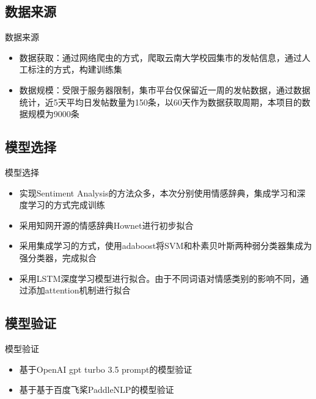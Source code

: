 \documentclass[UTF8]{ctexbeamer}
\begin{document}
\subsection{数据来源}
\begin{frame}{数据来源}
  \begin{itemize}
  \item {
    数据获取：通过网络爬虫的方式，爬取云南大学校园集市的发帖信息，通过人工标注的方式，构建训练集
  }
  \item {
    数据规模：受限于服务器限制，集市平台仅保留近一周的发帖数据，通过数据统计，近5天平均日发帖数量为150条，以60天作为数据获取周期，本项目的数据规模为9000条
  }
  \end{itemize}
\end{frame}

\subsection{模型选择}

\begin{frame}{模型选择}
   \begin{itemize}
  \item {
    实现Sentiment Analysis的方法众多，本次分别使用情感辞典，集成学习和深度学习的方式完成训练
  }
  \item {
    采用知网开源的情感辞典Hownet进行初步拟合
  }
  \item {
    采用集成学习的方式，使用adaboost将SVM和朴素贝叶斯两种弱分类器集成为强分类器，完成拟合
  }
  \item {
   采用LSTM深度学习模型进行拟合。由于不同词语对情感类别的影响不同，通过添加attention机制进行拟合
  }
  \end{itemize}
\end{frame}

\subsection{模型验证}
\begin{frame}{模型验证}
  \begin{itemize}
  \item {
    基于OpenAI gpt turbo 3.5 prompt的模型验证
  }
  \item {
    基于基于百度飞桨PaddleNLP的模型验证
  }
  \end{itemize}
\end{frame}




\end{document}
